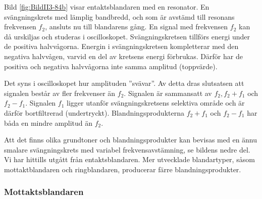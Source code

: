 Bild \ref{fig:BildII3-84b} visar entaktsblandaren med en resonator.
En svängningskrets med lämplig bandbredd, och som är avstämd till
resonans frekvensen \(f_2\), ansluts nu till blandarens gång.
En signal med frekvensen \(f_2\) kan då urskiljas och studeras i oscilloskopet.
Svängningskretsen tillförs energi under de positiva halvvågorna.
Energin i svängningskretsen kompletterar med den negativa halvvågen, varvid en
del av kretsens energi förbrukas.
Därför har de positiva och negativa halvvågorna inte samma amplitud (toppvärde).

Det syns i oscilloskopet hur amplituden ''svävar''.
Av detta dras slutsatsen att signalen består av fler frekvenser än \(f_2\).
Signalen är sammansatt av \(f_2, f_2+f_1\) och \(f_2-f_1\).
Signalen \(f_1\) ligger utanför svängningskretsens selektiva område och är
därför bortfiltrerad (undertryckt).
Blandningsprodukterna \(f_2 + f_1\) och \(f_2 - f_1\) har båda en mindre
amplitud än \(f_2\).

Att det finns olika grundtoner och blandningsprodukter kan bevisas med en ännu
smalare svängningskrets med variabel frekvensavstämning, se bildens nedre del.
Vi har hittills utgått från entaktsblandaren.
Mer utvecklade blandartyper, såsom mottaktblandaren och ringblandaren,
producerar färre blandningsprodukter.

\subsubsection{Mottaktsblandaren}

